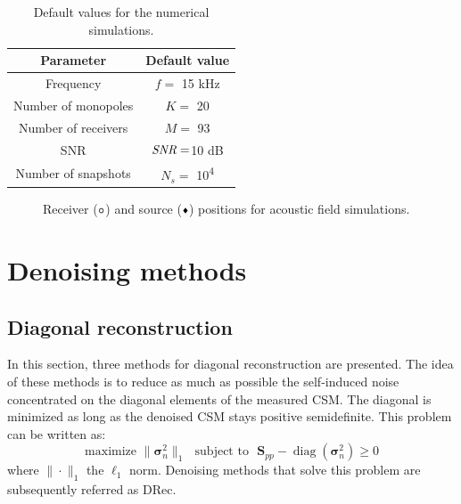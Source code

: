 \documentclass[fontsize=12pt,DIV13,paper=a4,abstract=true,titlepage=false]{scrartcl}
\newcommand{\diag}[1]{\operatorname{diag}\left(#1\right)}
\begin{document}
\begin{center}
\noindent\begin{minipage}{\linewidth}
      \begin{minipage}{0.47\linewidth}
          \begin{table}[H]
                   \setlength\extrarowheight{0.22cm}
		\begin{tabular}{c|c}%
			\hline \textbf{Parameter} &  \textbf{Default value} \\[0.2cm]\hline
			Frequency	&	$f=$ 		15 kHz \\ \hline
			Number of monopoles	&	$K=$		20\\ \hline
			Number of receivers	&	$M=$ 		93\\ \hline
			SNR	&	$\text{\itshape SNR}= $10 dB\\ \hline
			Number of snapshots	&	$N_s=$		10\textsuperscript{4} \\\hline
		\end{tabular}
		\vspace{0.3cm}\caption{Default values for the numerical simulations. \label{default_values}}
          \end{table}
                \vfill
      \end{minipage}
      \hspace{0.02\linewidth}
      \begin{minipage}{0.5\linewidth}
          \begin{figure}[H]
             	\centering
		
		\caption{Receiver ($\vcenter{\hbox{\small$\bm{\circ}$}}$) and source ($\vcenter{\hbox{\tiny$\blacklozenge$}}$) positions for acoustic field simulations. \label{config}}
          \end{figure}
      \end{minipage}
\end{minipage}
\end{center}

\section{Denoising methods}

\subsection{Diagonal reconstruction}
In this section, three methods for diagonal reconstruction are presented. The idea of these methods is to reduce as much as possible the self-induced noise concentrated on the diagonal elements of the measured CSM. The diagonal is minimized as long as the denoised CSM stays positive semidefinite. This problem can be written as: 
\begin{equation}
    \text{maximize~} \| \bm{\sigma}_{n}^2\|_1 \text{~~subject to~~} \bm{S}_{pp}- \diag{\bm{\sigma}_n^2} \geq 0
    \label{eq_drec}
\end{equation}
where $\|\cdot\|_1$ the $\ell_1$ norm.
Denoising methods that solve this problem are subsequently referred as DRec.
\end{document}
